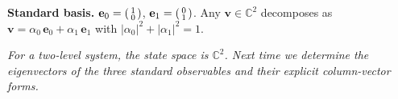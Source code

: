 \documentclass[12pt,a4paper]{article}
\begin{document}
\medskip
\noindent\textbf{Standard basis.}  $\mathbf{e}_0 = \begin{psmallmatrix}1\\0\end{psmallmatrix}$, $\mathbf{e}_1 = \begin{psmallmatrix}0\\1\end{psmallmatrix}$.  Any $\mathbf{v} \in \mathbb{C}^2$ decomposes as $\mathbf{v} = \alpha_0\,\mathbf{e}_0 + \alpha_1\,\mathbf{e}_1$ with $|\alpha_0|^2 + |\alpha_1|^2 = 1$.

\medskip
\noindent\textit{For a two-level system, the state space is $\mathbb{C}^2$.  Next time we determine the eigenvectors of the three standard observables and their explicit column-vector forms.}
\end{document}
